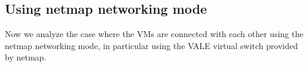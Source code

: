 \documentclass[a4paper, 12pt, titlepage]{report}
\begin{document}
\subsection{Using netmap networking mode} \label{subsec:using_netmap_mode}
Now we analyze the case where the VMs are connected with each other using the netmap networking mode, in particular using the VALE virtual switch provided by netmap. 
\end{document}
